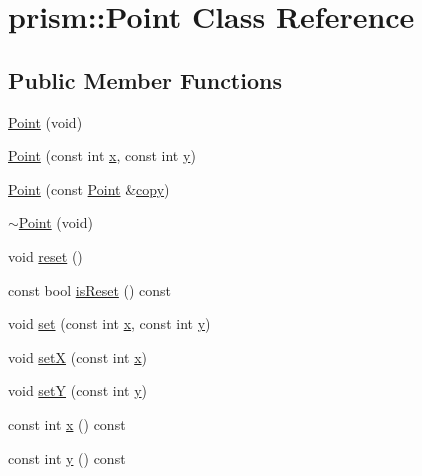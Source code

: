 \hypertarget{classprism_1_1_point}{}\section{prism\+:\+:Point Class Reference}
\label{classprism_1_1_point}
\subsection*{Public Member Functions}
\begin{DoxyCompactItemize}
\item 
\hyperlink{classprism_1_1_point_a505a19bd681a9e195f8bf9dbd3c445c7}{Point} (void)
\item 
\hyperlink{classprism_1_1_point_a93bfdd8fa48253786030802190577129}{Point} (const int \hyperlink{classprism_1_1_point_a725d8721ccf4e59ce9a912490e9487f9}{x}, const int \hyperlink{classprism_1_1_point_ac3283efaa56d37b9d69b7ff5e9d5c2f4}{y})
\item 
\hyperlink{classprism_1_1_point_af09a25c46be47b8c4566b15ddac632b0}{Point} (const \hyperlink{classprism_1_1_point}{Point} \&\hyperlink{namespaceprism_ae776f4cd825f79e7af1cf6ee1d90a209}{copy})
\item 
\hyperlink{classprism_1_1_point_a948aa05b80053c019bf963315a2cea8a}{$\sim$\+Point} (void)
\item 
void \hyperlink{classprism_1_1_point_abda32c4f2e16a5a3276949732992f911}{reset} ()
\item 
const bool \hyperlink{classprism_1_1_point_a426d00c2d9d582723ed69e1a73034641}{is\+Reset} () const 
\item 
void \hyperlink{classprism_1_1_point_ac327d98f8dfc1768a6aae63a144cf2fd}{set} (const int \hyperlink{classprism_1_1_point_a725d8721ccf4e59ce9a912490e9487f9}{x}, const int \hyperlink{classprism_1_1_point_ac3283efaa56d37b9d69b7ff5e9d5c2f4}{y})
\item 
void \hyperlink{classprism_1_1_point_a39aac064dac78373b3be254ab2bc6ab4}{setX} (const int \hyperlink{classprism_1_1_point_a725d8721ccf4e59ce9a912490e9487f9}{x})
\item 
void \hyperlink{classprism_1_1_point_afc2fc43295a911175d7e709b80dc2068}{setY} (const int \hyperlink{classprism_1_1_point_ac3283efaa56d37b9d69b7ff5e9d5c2f4}{y})
\item 
const int \hyperlink{classprism_1_1_point_a725d8721ccf4e59ce9a912490e9487f9}{x} () const 
\item 
const int \hyperlink{classprism_1_1_point_ac3283efaa56d37b9d69b7ff5e9d5c2f4}{y} () const 

\end{DoxyCompactItemize}
